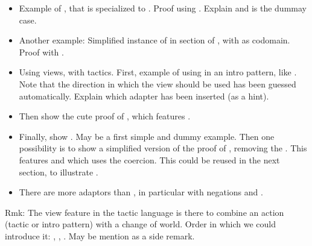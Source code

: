 \begin{itemize}

\item Example of , that is  specialized to
  . Proof using . Explain  and  is
  the dummay case.

\item Another example: Simplified instance of  in
  section   of , with  as
  codomain. Proof with .

\item Using views, with tactics. First, example of using  in
  an intro pattern, like . Note that the direction in
  which the view should be used has been guessed
  automatically. Explain which adapter has been inserted (as a hint).

\item Then show the cute proof of , which features
  .

\item Finally, show . May be a first
  simple and dummy example. Then one possibility is
  to show a simplified version of the proof of , removing
  the . This features 
  and  which uses the  coercion.
  This could be reused in the next section, to illustrate .


\item There are more adaptors than ,
  in particular with negations  and .

\end{itemize}

Rmk: The view feature in the tactic language is there to combine an
action (tactic or intro pattern) with a change of world. Order in
which we could introduce it: , ,
. May be mention  as a side remark.






